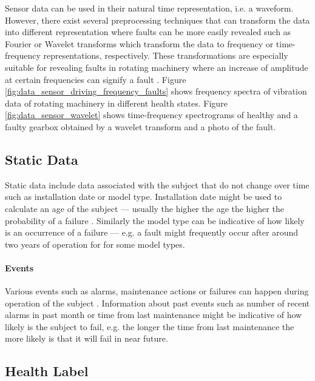Sensor data can be used in their natural time representation, i.e. a waveform.
However, there exist several preprocessing techniques that can transform the data into different representation where faults can be more easily revealed such as Fourier or Wavelet transforms which transform the data to frequency or time-frequency representations, respectively.
These transformations are especially suitable for revealing faults in rotating machinery where an increase of amplitude at certain frequencies can signify a fault \cite{lukany2018}.
Figure \ref{fig:data_sensor_driving_frequency_faults} shows frequency spectra of vibration data of rotating machinery in different health states.
Figure \ref{fig:data_sensor_wavelet} shows time-frequency spectrograms of healthy and a faulty gearbox obtained by a wavelet transform and a photo of the fault.

\subsection{Static Data}

Static data include data associated with the subject that do not change over time such as installation date or model type.
Installation date might be used to calculate an age of the subject --- usually the higher the age the higher the probability of a failure \cite{mobley2002introduction}.
Similarly the model type can be indicative of how likely is an occurrence of a failure \cite{data_set_azure_ai_gallery} --- e.g. a fault might frequently occur after around two years of operation for for some model types.

\paragraph{Events}

Various events such as alarms, maintenance actions or failures can happen during operation of the subject \cite{data_set_azure_ai_gallery}.
Information about past events such as number of recent alarms in past month or time from last maintenance might be indicative of how likely is the subject to fail, e.g. the longer the time from last maintenance the more likely is that it will fail in near future.

\subsection{Health Label}

